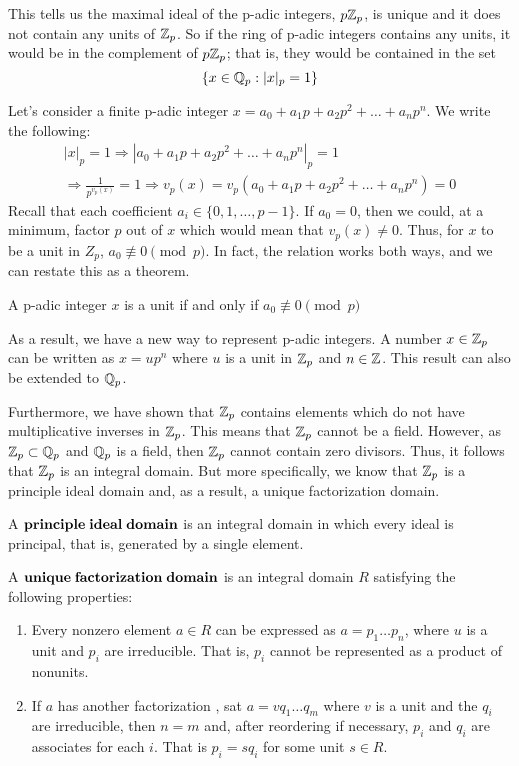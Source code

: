 \documentclass[a4paper]{article}
\begin{document}
This tells us the maximal ideal of the p-adic integers, $p\mathbb Z_p$, is
unique and it does not contain any units of $\mathbb Z_p$.  So if the ring
of p-adic integers contains any units, it would be in the complement of 
$p\mathbb Z_p$; that is, they would be contained in the set
\[
	\{x\in\mathbb Q_p:|x|_p=1\}
\]

Let's consider a finite p-adic integer $x=a_0+a_1p+a_2p^2+\dots+a_np^n$.  
We write the following:
\[
\begin{gathered}
	|x|_p=1\Rightarrow |a_0+a_1p+a_2p^2+\dots+a_np^n|_p=1\\
    \Rightarrow \frac{1}{p^{v_p(x)}}=1\Rightarrow
    v_p(x)=v_p(a_0+a_1p+a_2p^2+\dots+a_np^n)=0
\end{gathered}
\]
Recall that each coefficient $a_i\in\{0,1,\dots,p-1\}$.  
If $a_0=0$, then we could, at a minimum, factor $p$ out of $x$ which
would mean that $v_p(x)\neq 0$.  Thus, for $x$ to be a unit in $Z_p$, 
$a_0\not\equiv0\pmod p$.  In fact, the relation works both ways, and we 
can restate this as a theorem.

\begin{theorem}
A p-adic integer $x$ is a unit if and only if $a_0\not\equiv0\pmod p$
\end{theorem}

As a result, we have a new way to represent p-adic integers.  A number 
$x\in\mathbb Z_p$ can be written as $x=up^n$ where $u$ is a unit in 
$\mathbb Z_p$ and $n\in\mathbb Z$.  This result can also be extended to 
$\mathbb Q_p$.

Furthermore, we have shown that $\mathbb Z_p$ contains elements which do not
have multiplicative inverses in $\mathbb Z_p$.  This means that $\mathbb Z_p$
cannot be a field.  However, as $\mathbb Z_p\subset\mathbb Q_p$ and $\mathbb Q_p$ is
a field, then $\mathbb Z_p$ cannot contain zero divisors.  Thus, it follows 
that $\mathbb Z_p$ is an integral domain.  But more specifically, we know
that $\mathbb Z_p$ is a principle ideal domain and, as a result, a unique
factorization domain.

\begin{definition}
A $\bf{principle\;ideal\;domain}$ is an integral domain in which every
ideal is principal, that is, generated by a single element.
\end{definition}

\begin{definition}
A $\bf{unique\;factorization\;domain}$ is an integral domain $R$ 
satisfying the following properties:
\begin{enumerate}
\item Every nonzero element $a\in R$ can be expressed as 
$a=p_1\dots p_n$, where $u$ is a unit and $p_i$ are irreducible.  That
is, $p_i$ cannot be represented as a product of nonunits.
\item If $a$ has another factorization , sat $a=vq_1\dots q_m$ where $v$ 
is a unit and the $q_i$ are irreducible, then $n=m$ and, after 
reordering if necessary, $p_i$ and $q_i$ are associates for each $i$.  
That is $p_i=sq_i$ for some unit $s\in R$.
\end{enumerate}
\end{definition}
\end{document}
